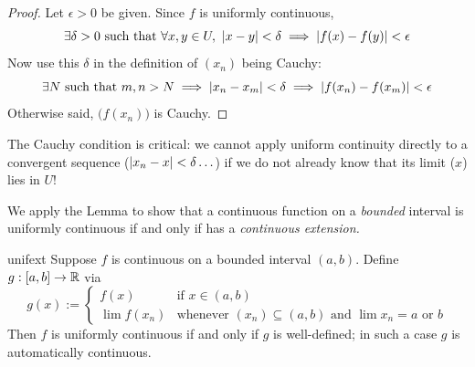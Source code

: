 \begin{proof}
	Let $\epsilon>0$ be given. Since $f$ is uniformly continuous,
	\[
		\exists\delta>0\text{ such that }
		\forall x,y\in U,\ \left| x-y\right|<\delta
		\implies\left| f(x)-f(y)\right|<\epsilon
	\]
	Now use this $\delta$ in the definition of $(x_n)$ being Cauchy:
	\[
		\exists N\text{ such that }
		m,n>N\implies\left| x_n-x_m\right|<\delta
		\implies\left| f(x_n)-f(x_m)\right|<\epsilon
	\]
	Otherwise said, $\bigl(f(x_n)\bigr)$ is Cauchy.
\end{proof}

	The Cauchy condition is critical: we cannot apply uniform continuity directly to a convergent sequence ($\left| x_n-x\right|<\delta\ldots$) if we do not already know that its limit ($x$) lies in $U$!


\goodbreak


We apply the Lemma to show that a continuous function on a \emph{bounded} interval is uniformly continuous if and only if has a \emph{continuous extension.}

\begin{thm}{}{unifext}
	Suppose $f$ is continuous on a bounded interval $(a,b)$. Define $g:[a,b]\to \mathbb{R}$ via
	\[
		g(x):=
		\begin{cases}
			f(x)&\text{if }x\in (a,b)\\
			\lim f(x_n)
				&\text{whenever $(x_n)\subseteq (a,b)$ and $\lim x_n=a$ or $b$}
		\end{cases}
	\]
	Then $f$ is uniformly continuous if and only if $g$ is well-defined; in such a case $g$ is automatically continuous.
\end{thm}

